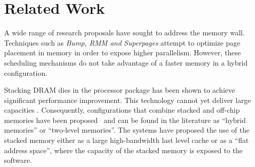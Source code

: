 
\section{Related Work}
\label{sec:Background}

A wide range of research proposals have sought to address the memory wall. 
Techniques such as \textit{Bump\cite{BUMP}, RMM\cite{RMM} and Superpages\cite{SUPERPAGES}} attempt to optimize page placement in memory in order to expose higher parallelism. However, these scheduling mechanisms do not take advantage of a faster memory in a hybrid configuration.

Stacking DRAM dies in the processor package has been shown to achieve significant performance improvement. This technology cannot yet deliver large capacities \cite{JEDEC-HBM-REVISED}. Consequently, configurations that combine
stacked and off-chip memories have been proposed~\cite{LOH-HYBRID,qureshi-micro2012} and can be found in the literature as ``hybrid memories'' or ``two-level memories''. The systems have proposed the use of the stacked memory
either as a large high-bandwidth last level cache or as a ``flat address space'', where the capacity of the stacked memory is exposed to the software.

